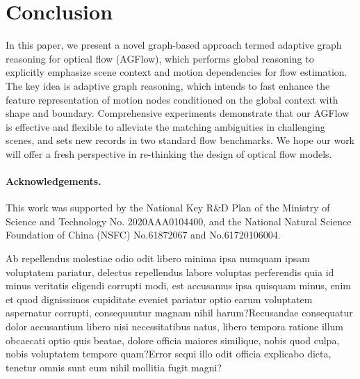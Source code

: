 \documentclass[letterpaper]{article} %
\begin{document}
\vspace{-3.45mm}
\section{Conclusion}

In this paper, we present a novel graph-based approach termed adaptive graph reasoning for optical flow (AGFlow), which performs global reasoning to explicitly emphasize scene context and motion dependencies for flow estimation. The key idea is adaptive graph reasoning, which intends to fast enhance the feature representation of motion nodes conditioned on the global context with shape and boundary. Comprehensive experiments demonstrate that our AGFlow is effective and flexible to alleviate the matching ambiguities in challenging scenes, and sets new records in two standard flow benchmarks. We hope our work will offer a fresh perspective in re-thinking the design of optical flow models.

\paragraph{Acknowledgements.}
This work was supported by the National Key R\&D Plan of the Ministry of Science and Technology No. 2020AAA0104400, and the National Natural Science Foundation of China (NSFC) No.61872067 and No.61720106004.

Ab repellendus molestiae odio odit libero minima ipsa numquam ipsam voluptatem pariatur, delectus repellendus labore voluptas perferendis quia id minus veritatis eligendi corrupti modi, est accusamus ipsa quisquam minus, enim et quod dignissimos cupiditate eveniet pariatur optio earum voluptatem aspernatur corrupti, consequuntur magnam nihil harum?Recusandae consequatur dolor accusantium libero nisi necessitatibus natus, libero tempora ratione illum obcaecati optio quis beatae, dolore officia maiores similique, nobis quod culpa, nobis voluptatem tempore quam?Error sequi illo odit officia explicabo dicta, tenetur omnis sunt eum nihil mollitia fugit magni?\clearpage

\end{document}
